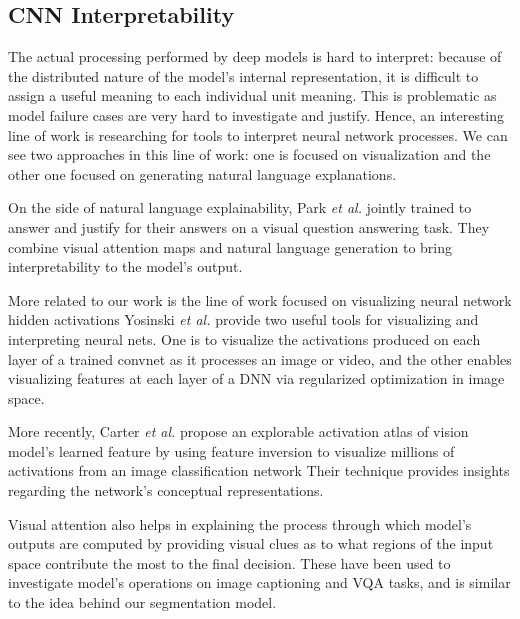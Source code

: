 \documentclass[10pt,twocolumn,letterpaper]{article}
\begin{document}
\subsection{CNN Interpretability}
The actual processing performed by deep models is hard to interpret:
because of the distributed nature of the model's internal representation,
it is difficult to assign a useful meaning to each individual unit meaning.
This is problematic as model failure cases are very hard to investigate and justify.
Hence, an interesting line of work is researching for tools to interpret neural network processes.
We can see two approaches in this line of work:
one is focused on visualization and the other one focused on generating natural language explanations.
 
On the side of natural language explainability, Park \textit{et al.} \cite{park2016attentive} jointly trained to answer and justify for their
answers on a visual question answering task. 
They combine visual attention maps and natural language generation to bring interpretability to the model's output.
 
More related to our work is the line of work focused on visualizing neural network hidden activations
Yosinski \textit{et al.} \cite{yosinski2015understanding} provide two useful tools for visualizing and interpreting neural nets. 
One is to visualize  the activations produced on each layer of a trained convnet as it 
processes an image or video, and the other enables visualizing 
features at each layer of a DNN via regularized optimization in image space.

More recently, Carter \textit{et al.} \cite{carter2019activation} propose an explorable activation atlas of vision model's learned feature by using feature inversion to visualize millions of activations from an image classification network
Their technique provides insights regarding the network's conceptual representations.

Visual attention \cite{xu2015show} also helps in explaining the process through which model's 
outputs are computed by providing visual clues as to what regions of the input space 
contribute the most to the final decision. 
These have been used to investigate model's operations on image captioning \cite{xu2015show,you2016image} and VQA \cite{antol2015vqa,zhang2016yin,goyal2017making} tasks,
and is similar to the idea behind our segmentation model.
\end{document}
